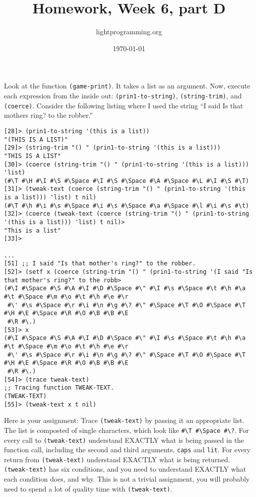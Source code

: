 \documentclass{article}
\title{Homework, Week 6, part D}
\author{lightprogramming.org}
\date{\today}
\begin{document}
\maketitle{}

Look at the function \texttt{(game-print)}. It takes a list as an argument. Now, execute each expression from the inside out:  \texttt{(prin1-to-string)}, \texttt{(string-trim)}, and \texttt{(coerce)}. Consider the following listing where I used the string ``I said \textquotesingle\textquotesingle{}Is that mother\textquotesingle{}s ring?\textquotesingle\textquotesingle{} to the robber.''

\lstset{language=Lisp,numbers=left,keepspaces=false,basicstyle=\small,numberstyle=\tiny,breaklines=true,showstringspaces=false}
\begin{lstlisting}
[28]> (prin1-to-string '(this is a list))
"(THIS IS A LIST)"
[29]> (string-trim "() " (prin1-to-string '(this is a list)))
"THIS IS A LIST"
[30]> (coerce (string-trim "() " (prin1-to-string '(this is a list))) 'list)
(#\T #\H #\I #\S #\Space #\I #\S #\Space #\A #\Space #\L #\I #\S #\T)
[31]> (tweak-text (coerce (string-trim "() " (prin1-to-string '(this is a list))) 'list) t nil)
(#\T #\h #\i #\s #\Space #\i #\s #\Space #\a #\Space #\l #\i #\s #\t)
[32]> (coerce (tweak-text (coerce (string-trim "() " (prin1-to-string '(this is a list))) 'list) t nil)>
"This is a list"
[33]>

...
[51] ;; I said "Is that mother's ring?" to the robber.
[52]> (setf x (coerce (string-trim "() " (prin1-to-string '(I said "Is that mother's ring?" to the robb>
(#\I #\Space #\S #\A #\I #\D #\Space #\" #\I #\s #\Space #\t #\h #\a #\t #\Space #\m #\o #\t #\h #\e #\r
 #\' #\s #\Space #\r #\i #\n #\g #\? #\" #\Space #\T #\O #\Space #\T #\H #\E #\Space #\R #\O #\B #\B #\E
 #\R #\.)
[53]> x
(#\I #\Space #\S #\A #\I #\D #\Space #\" #\I #\s #\Space #\t #\h #\a #\t #\Space #\m #\o #\t #\h #\e #\r
 #\' #\s #\Space #\r #\i #\n #\g #\? #\" #\Space #\T #\O #\Space #\T #\H #\E #\Space #\R #\O #\B #\B #\E
 #\R #\.)
[54]> (trace tweak-text)
;; Tracing function TWEAK-TEXT.
(TWEAK-TEXT)
[55]> (tweak-text x t nil)
\end{lstlisting}

Here is your assignment: Trace \texttt{(tweak-text)} by passing it an appropriate list. The list is composted of single characters, which look like \texttt{\#\textbackslash{}T \#\textbackslash{}Space \#\textbackslash{}?}. For every call to \texttt{(tweak-text)} understand EXACTLY what is being passed in the function call, including the second and third arguments, \texttt{caps} and \texttt{lit}. For every return from \texttt{(tweak-text)} understand EXACTLY what is being returned. \texttt{(tweak-text)} has six conditions, and you need to understand EXACTLY what each condition does, and why. This is not a trivial assignment, you will probably need to spend a lot of quality time with \texttt{(tweak-text)}.
\end{document}
